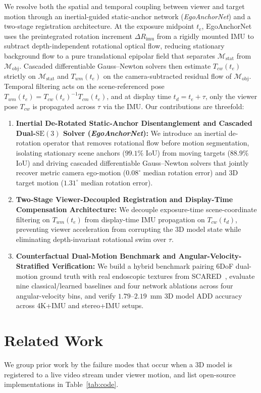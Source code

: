 \documentclass[journal]{IEEEtran}
\begin{document}
We resolve both the spatial and temporal coupling between viewer and target motion through an inertial-guided static-anchor network (\emph{EgoAnchorNet}) and a two-stage registration architecture. At the exposure midpoint $t_e$, EgoAnchorNet uses the preintegrated rotation increment $\Delta R_{\text{imu}}$ from a rigidly mounted IMU to subtract depth-independent rotational optical flow, reducing stationary background flow to a pure translational epipolar field that separates $\mathcal{M}_{\text{stat}}$ from $\mathcal{M}_{\text{obj}}$. Cascaded differentiable Gauss--Newton solvers then estimate $T_{cw}(t_e)$ strictly on $\mathcal{M}_{\text{stat}}$ and $T_{wm}(t_e)$ on the camera-subtracted residual flow of $\mathcal{M}_{\text{obj}}$. Temporal filtering acts on the scene-referenced pose $T_{wm}(t_e) = T_{cw}(t_e)^{-1}T_{cm}(t_e)$, and at display time $t_d = t_e + \tau$, only the viewer pose $T_{cw}$ is propagated across $\tau$ via the IMU. Our contributions are threefold:
\begin{enumerate}
    \item \textbf{Inertial De-Rotated Static-Anchor Disentanglement and Cascaded Dual-$\mathrm{SE}(3)$ Solver (\emph{EgoAnchorNet}):} We introduce an inertial de-rotation operator that removes rotational flow before motion segmentation, isolating stationary scene anchors ($99.1\%$ IoU) from moving targets ($88.9\%$ IoU) and driving cascaded differentiable Gauss--Newton solvers that jointly recover metric camera ego-motion ($0.08^\circ$ median rotation error) and 3D target motion ($1.31^\circ$ median rotation error).
    \item \textbf{Two-Stage Viewer-Decoupled Registration and Display-Time Compensation Architecture:} We decouple exposure-time scene-coordinate filtering on $T_{wm}(t_e)$ from display-time IMU propagation on $T_{cw}(t_d)$, preventing viewer acceleration from corrupting the 3D model state while eliminating depth-invariant rotational swim over $\tau$.
    \item \textbf{Counterfactual Dual-Motion Benchmark and Angular-Velocity-Stratified Verification:} We build a hybrid benchmark pairing 6DoF dual-motion ground truth with real endoscopic textures from SCARED~\cite{allan2021scared}, evaluate nine classical/learned baselines and four network ablations across four angular-velocity bins, and verify $1.79\text{--}2.19$~mm 3D model ADD accuracy across 4K+IMU and stereo+IMU setups.
\end{enumerate}

\section{Related Work}
We group prior work by the failure modes that occur when a 3D model is registered to a live video stream under viewer motion, and list open-source implementations in Table~\ref{tab:code}.
\end{document}
